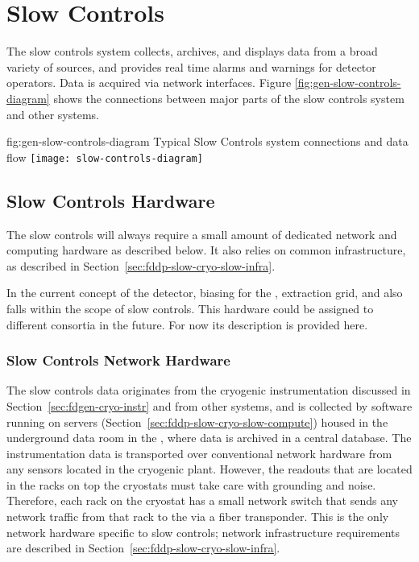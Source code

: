 \section{Slow Controls}
\label{sec:fddp-slow-cryo-ctrl}


The slow controls system collects, archives, and displays data from
a broad variety of sources, and provides real time alarms and
warnings for detector operators. Data is acquired via network
interfaces.  Figure \ref{fig:gen-slow-controls-diagram} shows the
connections between major parts of the slow controls system and other
systems.  %

\begin{dunefigure}{fig:gen-slow-controls-diagram}
{Typical Slow Controls system connections and data flow}
\texttt{[image: slow-controls-diagram]}
\end{dunefigure}





\subsection{Slow Controls Hardware}
\label{sec:fddp-slow-cryo-hdwr}

The slow controls will always require a small amount of dedicated network and
computing hardware as described below.  It also relies on common
infrastructure, as described in
Section~\ref{sec:fddp-slow-cryo-slow-infra}.

In the current concept of the \dual detector,  biasing for the , extraction grid, and  also falls within the scope of slow controls.  This hardware could be assigned to different consortia in the future.  For now its description is provided here.

\subsubsection{Slow Controls Network Hardware}
\label{sec:fddp-slow-cryo-slow-network}
The slow controls data originates from the cryogenic instrumentation discussed in
Section~\ref{sec:fdgen-cryo-instr} and from other systems,
and is collected by software running on servers
(Section~\ref{sec:fddp-slow-cryo-slow-compute})
housed in the underground data room in the ,
where data is archived in a central  database.
The instrumentation data is transported over
conventional network hardware from any sensors located in the cryogenic
plant.  However, the readouts that are located in the racks on top the
cryostats must take care with grounding and noise.  Therefore, each
rack on the cryostat has a small network switch that sends
any network traffic from that rack to the  via a fiber transponder.
This is the only network hardware specific to slow controls;
network infrastructure requirements are described in
Section~\ref{sec:fddp-slow-cryo-slow-infra}.

